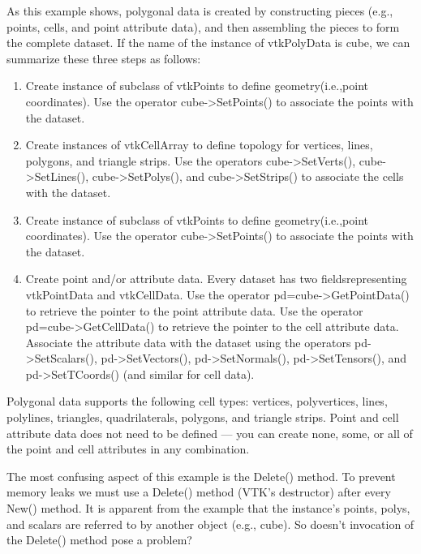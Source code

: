 \begin{description}[leftmargin=0cm,labelindent=0cm]
As this example shows, polygonal data is created by constructing pieces (e.g., points, cells, and point attribute data), and then assembling the pieces to form the complete dataset. If the name of the instance of vtkPolyData is cube, we can summarize these three steps as follows:

\begin{enumerate}

	\item Create instance of subclass of vtkPoints to define geometry(i.e.,point coordinates). Use the operator cube->SetPoints() to associate the points with the dataset.

	\item Create instances of vtkCellArray to define topology for vertices, lines, polygons, and triangle strips. Use the operators cube->SetVerts(), cube->SetLines(), cube->SetPolys(), and cube->SetStrips() to associate the cells with the dataset.

	\item Create instance of subclass of vtkPoints to define geometry(i.e.,point coordinates). Use the operator cube->SetPoints() to associate the points with the dataset.

	\item Create point and/or attribute data. Every dataset has two fieldsrepresenting vtkPointData and vtkCellData. Use the operator pd=cube->GetPointData() to retrieve the pointer to the point attribute data. Use the operator pd=cube->GetCellData() to retrieve the pointer to the cell attribute data. Associate the attribute data with the dataset using the operators pd->SetScalars(), pd->SetVectors(), pd->SetNormals(), pd->SetTensors(), and pd->SetTCoords() (and similar for cell data).

\end{enumerate}

Polygonal data supports the following cell types: vertices, polyvertices, lines, polylines, triangles, quadrilaterals, polygons, and triangle strips. Point and cell attribute data does not need to be defined  --- you can create none, some, or all of the point and cell attributes in any combination.

The most confusing aspect of this example is the Delete() method. To prevent memory leaks we must use a Delete() method (VTK's destructor) after every New() method. It is apparent from the example that the instance's points, polys, and scalars are referred to by another object (e.g., cube). So doesn’t invocation of the Delete() method pose a problem?


\end{description}
